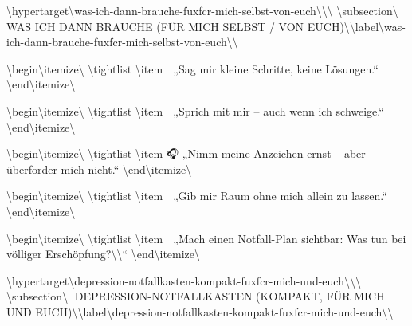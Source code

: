\textbackslash{}hypertarget\textbackslash{}{was-ich-dann-brauche-fuxfcr-mich-selbst-von-euch\textbackslash{}}\textbackslash{}{\textbackslash{}%
\textbackslash{}subsection\textbackslash{}{🧭 WAS ICH DANN BRAUCHE (FÜR MICH SELBST / VON EUCH)\textbackslash{}}\textbackslash{}label\textbackslash{}{was-ich-dann-brauche-fuxfcr-mich-selbst-von-euch\textbackslash{}}\textbackslash{}}

\textbackslash{}begin\textbackslash{}{itemize\textbackslash{}}
\textbackslash{}tightlist
\textbackslash{}item
  🧠 „Sag mir kleine Schritte, keine Lösungen.``
\textbackslash{}end\textbackslash{}{itemize\textbackslash{}}

\textbackslash{}begin\textbackslash{}{itemize\textbackslash{}}
\textbackslash{}tightlist
\textbackslash{}item
  💬 „Sprich mit mir -- auch wenn ich schweige.``
\textbackslash{}end\textbackslash{}{itemize\textbackslash{}}

\textbackslash{}begin\textbackslash{}{itemize\textbackslash{}}
\textbackslash{}tightlist
\textbackslash{}item
  🎧 „Nimm meine Anzeichen ernst -- aber überforder mich nicht.``
\textbackslash{}end\textbackslash{}{itemize\textbackslash{}}

\textbackslash{}begin\textbackslash{}{itemize\textbackslash{}}
\textbackslash{}tightlist
\textbackslash{}item
  🧍 „Gib mir Raum ohne mich allein zu lassen.``
\textbackslash{}end\textbackslash{}{itemize\textbackslash{}}

\textbackslash{}begin\textbackslash{}{itemize\textbackslash{}}
\textbackslash{}tightlist
\textbackslash{}item
  📎 „Mach einen Notfall-Plan sichtbar: Was tun bei völliger Erschöpfung?\textbackslash{}{\textbackslash{}}``
\textbackslash{}end\textbackslash{}{itemize\textbackslash{}}

\textbackslash{}hypertarget\textbackslash{}{depression-notfallkasten-kompakt-fuxfcr-mich-und-euch\textbackslash{}}\textbackslash{}{\textbackslash{}%
\textbackslash{}subsection\textbackslash{}{🧰 DEPRESSION-NOTFALLKASTEN (KOMPAKT, FÜR MICH UND EUCH)\textbackslash{}}\textbackslash{}label\textbackslash{}{depression-notfallkasten-kompakt-fuxfcr-mich-und-euch\textbackslash{}}\textbackslash{}}

